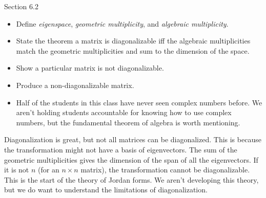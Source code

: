 \documentclass{problemset}
\newcommand{\bookonlynewpage}{\begin{bookonly}\newpage\end{bookonly}}
\begin{document}
\begin{lesson}

	Section 6.2

	\begin{itemize}
		\item Define \emph{eigenspace}, \emph{geometric multiplicity}, and \emph{algebraic multiplicity}.
		\item State the theorem a matrix is diagonalizable iff the algebraic multiplicities match the geometric
			multiplicities and sum to the dimension of the space.
		\item Show a particular matrix is not diagonalizable.
		\item Produce a non-diagonalizable matrix.
	\end{itemize}

	\begin{annotation}
		\begin{notes}
			\begin{itemize}
				\item Half of the students in this class have never seen complex
					numbers before. We aren't holding students accountable
					for knowing how to use complex numbers, but the fundamental
					theorem of algebra is worth mentioning.
			\end{itemize}
		\end{notes}
	\end{annotation}
	Diagonalization is great, but not all matrices can be diagonalized. This is because the transformation might not
	have a basis of eigenvectors. The sum of the geometric multiplicities gives the dimension of the span
	of all the eigenvectors. If it is not $n$ (for an $n\times n$ matrix), the transformation cannot be diagonalizable.
	This is the start of the theory of Jordan forms. We aren't developing this theory, but we do want to understand
	the limitations of diagonalization.

\end{lesson}

	\bookonlynewpage
\end{document}
